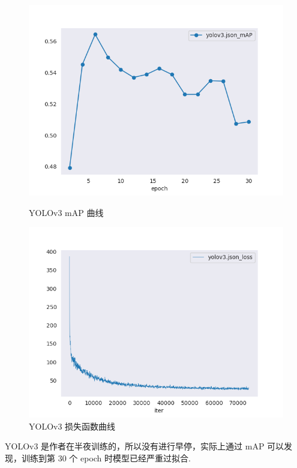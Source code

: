 \documentclass[notitlepage,cs4size,punct,oneside]{ctexrep}
\numberwithin{equation}{chapter}
\theoremstyle{mystyle}
\begin{document}
\begin{figure}[!htpb]
    \centering
    \begin{minipage}[t]{0.49\textwidth}
    \includegraphics[width=\linewidth]{yolov3_mAP.png}
    \caption{YOLOv3 mAP 曲线}
    \label{mAPfrcnn}
    \end{minipage}
    \begin{minipage}[t]{0.49\textwidth}
    \includegraphics[width=\linewidth]{yolov3_loss.png}
    \caption{YOLOv3 损失函数曲线}
    \label{frcnn_loss}
    \end{minipage}
\end{figure}

YOLOv3 是作者在半夜训练的，所以没有进行早停，实际上通过 mAP 可以发现，训练到第 30 个 epoch 时模型已经严重过拟合.
\end{document}

